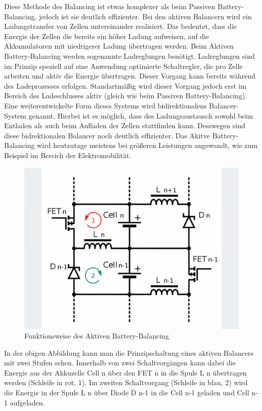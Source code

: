Diese Methode des Balancing ist etwas komplexer als beim Passiven Battery-Balancing, jedoch ist sie deutlich effizienter. Bei den aktiven Balancern wird ein Ladungstransfer von Zellen untereinander realisiert. Das bedeutet, dass die Energie der Zellen die bereits ein höher Ladung aufweisen, auf die Akkumulatoren mit niedrigerer Ladung übertragen werden. Beim Aktiven Battery-Balancing werden sogenannte Ladreglungen benötigt. Ladreglungen sind im Prinzip speziell auf eine Anwendung optimierte Schaltregler, die pro Zelle arbeiten und aktiv die Energie übertragen. Dieser Vorgang kann bereits während des Ladeprozesses erfolgen. Standartmäßig wird dieser Vorgang jedoch erst im Bereich des Ladeschlusses aktiv (gleich wie beim Passiven Battery-Balancing). Eine weiterentwickelte Form dieses Systems wird bidirektionalens Balancer-System genannt. Hierbei ist es möglich, dass des Ladungsaustausch sowohl beim Entladen als auch beim Aufladen der Zellen stattfinden kann. Desswegen sind diese bidrektionalen Balancer noch deutlich effizienter. Das Akitve Battery-Balancing wird heutzutage meistens bei größeren Leistungen angewandt, wie zum Beispiel im Bereich der Elektromobilität.

\begin{figure}[H]
	\begin{center}
		\includegraphics[scale=0.4]{figures/Akku/Aktives Balancing.png}
		\caption{Funktionsweise des Aktiven Battery-Balancing}
	\end{center}
\end{figure}

In der obigen Abbildung kann man die Prinzipschaltung eines aktiven Balancers mit zwei Stufen sehen. Innerhalb von zwei Schaltvorgängen kann dabei die Energie aus der Akkuzelle Cell n über den FET n in die Spule L n übertragen werden (Schleife in rot, 1).
Im zweiten Schaltvorgang (Schleife in blau, 2) wird die Energie in der Spule L n über Diode D n-1 in die Cell n-1 geladen und Cell n-1 aufgeladen.

